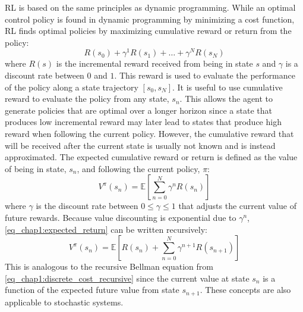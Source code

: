 RL is based on the same principles as dynamic programming.
While an optimal control policy is found in dynamic programming by minimizing a cost function, RL finds optimal policies by maximizing cumulative reward or return from the policy:
%
\begin{equation}
R(s_0) + \gamma^1R(s_1) + \dots +  \gamma^NR(s_N)
\end{equation}
%
where $R(s)$ is the incremental reward received from being in state $s$ and $\gamma$ is a discount rate between $0$ and $1$. This reward is used to evaluate the performance of the policy along a state trajectory $[s_0, s_N]$. It is useful to use cumulative reward to evaluate the policy from any state, $s_n$.
%
This allows the agent to generate policies that are optimal over a longer horizon since a state that produces low incremental reward may later lead to states that produce high reward when following the current policy. However, the cumulative reward that will be received after the current state is usually not known and is instead approximated.
%
The expected cumulative reward or return is defined as the value of being in state, $s_n$, and following the current policy, $\pi$:
%
\begin{equation}
V^\pi(s_n) = \mathbb{E}\left[\sum_{n=0}^N \gamma^n R(s_n) \right]
\label{eq_chap1:expected_return}
\end{equation}
%
where $\gamma$ is the discount rate between $0\leq \gamma \leq 1$ that adjusts the current value of future rewards.
Because value discounting is exponential due to $\gamma^n$, \eqref{eq_chap1:expected_return} can be written recursively:
%
\begin{equation}
V^\pi(s_n) = \mathbb{E}\left[R(s_n) + \sum_{n=0}^N \gamma^{n+1} R(s_{n+1}) \right]
\label{eq_chap1:expected_return_recursive}
\end{equation}
%
This is analogous to the recursive Bellman equation from \eqref{eq_chap1:discrete_cost_recursive} since the current value at state $s_n$ is a function of the expected future value from state $s_{n+1}$.
%
These concepts are also applicable to stochastic systems.
